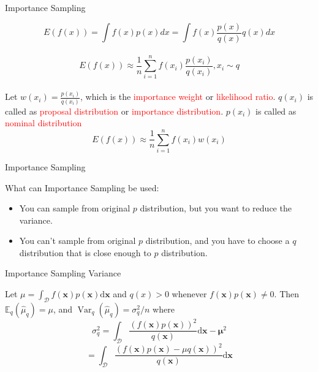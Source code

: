 \begin{frame}{Importance Sampling}
\begin{definition}
\[E(f(x))=\int f(x)p(x)dx=\int f(x)\frac{p(x)}{q(x)}q(x)dx\]\\ \[E(f(x))\approx \frac{1}{n}\sum_{i=1}^{n}f(x_{i})\frac{p(x_{i})}{q(x_{i})}, x_{i}\sim q\]\\
Let $ w(x_{i}) = \frac{p(x_{i})}{q(x_{i})} $, which is the \textcolor{red}{importance weight} or \textcolor{red}{likelihood ratio}. $q(x_{i})$ is called as \textcolor{red}{proposal distribution} or \textcolor{red}{importance distribution}. $p(x_{i})$ is called as \textcolor{red}{nominal distribution}\\
\[E(f(x))\approx \frac{1}{n}\sum_{i=1}^{n}f(x_{i})w(x_{i})\]
\end{definition}
\end{frame}

\begin{frame}{Importance Sampling}

\begin{block}{What can Importance Sampling be used:}
\begin{itemize}
\item You can sample from original $p$ distribution, but you want to reduce the variance.
\item You can't sample from original $p$ distribution, and you have to choose a $q$ distribution that is close enough to $p$ distribution.
\end{itemize}
\end{block}

\end{frame}

\begin{frame}{Importance Sampling Variance}

Let $\mu=\int_{\mathcal{D}} f(\boldsymbol{x}) p(\boldsymbol{x}) \mathrm{d} \boldsymbol{x}$ and $q(x)>0$ whenever $f(\boldsymbol{x}) p(\boldsymbol{x}) \neq 0$. Then $\mathbb{E}_{q}\left(\hat{\mu}_{q}\right)=\mu$, and $\operatorname{Var}_{q}\left(\hat{\mu}_{q}\right)=\sigma_{q}^{2} / n$ where\\
\[\sigma_{q}^{2}=\int_{\mathcal{D}} \frac{(f(\boldsymbol{x}) p(\boldsymbol{x}))^{2}}{q(\boldsymbol{x})} \mathrm{d} \boldsymbol{x}-\boldsymbol{\mu}^{2}\]
\[=\int_{\mathcal{D}} \frac{(f(\boldsymbol{x}) p(\boldsymbol{x})-\mu q(\boldsymbol{x}))^{2}}{q(\boldsymbol{x})} \mathrm{d} \boldsymbol{x}\]

\end{frame}

